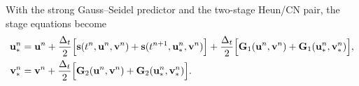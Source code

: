 With the strong Gauss--Seidel predictor and the two-stage Heun/CN pair, the stage equations become
\begin{subequations}\label{eq:ch2-nonlinear-1d-stage}
    \begin{align}
        \mathbf{u}^{n}_{*}
         & =
        \mathbf{u}^{n}
        +
        \frac{\Delta_t}{2}
        \Bigl[
            \mathbf{s}(t^{n},\mathbf{u}^{n},\mathbf{v}^{n})
            +
            \mathbf{s}(t^{n+1},\mathbf{u}^{n}_{*},\mathbf{v}^{n})
            \Bigr]
        +
        \frac{\Delta_t}{2}
        \Bigl[
            \mathbf{G}_1(\mathbf{u}^{n},\mathbf{v}^{n})
            +
            \mathbf{G}_1(\mathbf{u}^{n}_{*},\mathbf{v}^{n}_{*})
            \Bigr],
        \label{eq:ch2-nonlinear-1d-stage-a} \\
        \mathbf{v}^{n}_{*}
         & =
        \mathbf{v}^{n}
        +
        \frac{\Delta_t}{2}
        \Bigl[
            \mathbf{G}_2(\mathbf{u}^{n},\mathbf{v}^{n})
            +
            \mathbf{G}_2(\mathbf{u}^{n}_{*},\mathbf{v}^{n}_{*})
            \Bigr].
        \label{eq:ch2-nonlinear-1d-stage-b}
    \end{align}
\end{subequations}

